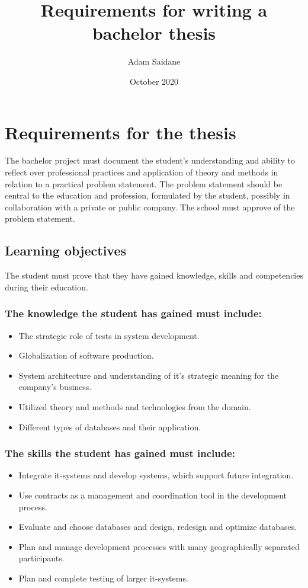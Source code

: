 \documentclass{article}
\begin{document}
\title{Requirements for writing a bachelor thesis}
\author{Adam Saidane}
\date{October 2020}
\maketitle
\tableofcontents
\section{Requirements for the thesis}
The bachelor project must document the student's understanding and ability to reflect over professional practices and application of theory and methods in relation to a practical problem statement. The problem statement should be central to the education and profession, formulated by the student, possibly in collaboration with a private or public company. The school must approve of the problem statement\cite[my translation]{curriculum}. 

\subsection{Learning objectives}
The student must prove that they have gained knowledge, skills and competencies during their education.  
\subsubsection{The knowledge the student has gained must include: } 
\begin{itemize}
	\item The strategic role of tests in system development. 
	\item Globalization of software production. 
	\item System architecture and understanding of it's strategic meaning for the company's business. 
	\item Utilized theory and methods and technologies from the domain. 
	\item Different types of databases and their application. 
\end{itemize} \cite[my translation]{curriculum}

\subsubsection{The skills the student has gained must include: }
\begin{itemize}
	\item Integrate it-systems and develop systems, which support future integration.
	\item Use contracts as a management and coordination tool in the development process. 
	\item Evaluate and choose databases and design, redesign and optimize databases.
	\item Plan and manage development processes with many geographically separated participants.
	\item Plan and complete testing of larger it-systems.
\end{itemize}\cite[my translation]{curriculum}
\end{document}
